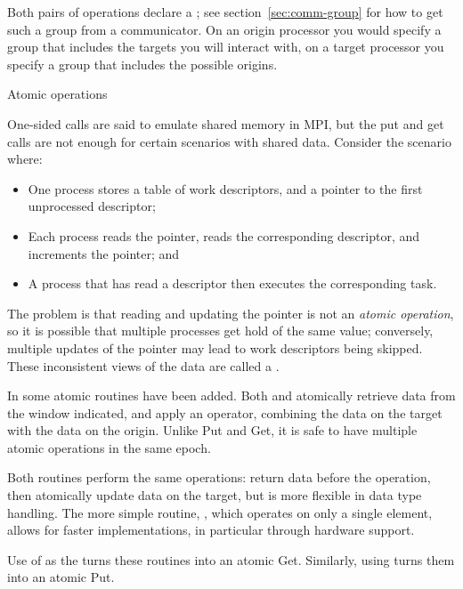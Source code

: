 Both pairs of operations declare a
; see section~\ref{sec:comm-group}
for how to get such a group from a communicator.
On an origin processor you would specify a group that includes the targets
you will interact with, on a target processor you specify a group
that includes the possible origins.

 {Atomic operations}
\label{sec:mpi-atomic}

One-sided calls are said to emulate shared memory in MPI, but 
the put and get calls are not enough for certain scenarios with shared
data. Consider the scenario where:

\begin{itemize}
\item One process stores a table of work descriptors, and a pointer to
  the first unprocessed descriptor;
\item Each process reads the pointer, reads the corresponding
  descriptor, and increments the pointer; and
\item A process that has read a descriptor then executes the
  corresponding task.
\end{itemize}

The problem is that reading and updating the pointer is not an
\emph{atomic operation}, so
it is possible that multiple processes get hold of the same value;
conversely, multiple updates of the pointer may lead to work
descriptors being skipped. These inconsistent views of the data are
called a .

In  some atomic routines have been added.
Both  and 
atomically retrieve data from the window indicated,
and apply an operator, combining the data on the target
with the data on the origin.
Unlike Put and Get, it is safe to have multiple atomic operations
in the same epoch.

Both routines perform the same operations: return data before the
operation, then atomically update data on the target, but
 is more flexible in data type
handling. The more simple routine, ,
which operates on only a single element,
allows for faster implementations, in particular through hardware support.

Use of  as the 
turns these routines into an atomic Get. Similarly, using
 turns them into an atomic Put.

